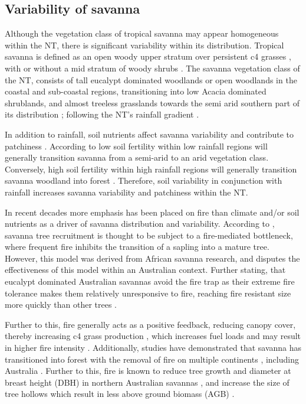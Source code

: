 \subsection{Variability of savanna}
Although the vegetation class of tropical savanna may appear homogeneous within the NT, there is significant variability within its distribution. Tropical savanna is defined as an open woody upper stratum over persistent c4 grasses \citep{williamsetal1997}, with or without a mid stratum of woody shrubs \citep{lehmannetal2011}. The savanna vegetation class of the NT, consists of tall eucalypt dominated woodlands or open woodlands in the coastal and sub-coastal regions, transitioning into low Acacia dominated shrublands, and almost treeless grasslands towards the semi arid southern part of its distribution \citep{foxetal2001, williamsetal1997, woinarski2007}; following  the NT's rainfall gradient \citep{houseHall2001, hutleyetal2011, lehmannetal2011, williams1996}.

In addition to rainfall, soil nutrients affect savanna variability and contribute to patchiness \citep{williams1996}. According to \cite{houseHall2001} low soil fertility within low rainfall regions will generally transition savanna from a semi-arid to an arid vegetation class. Conversely, high soil fertility within high rainfall regions will generally transition savanna woodland into forest \citep{houseHall2001, williams1996}. Therefore, soil variability in conjunction with rainfall increases savanna variability and patchiness within the NT.

In recent decades more emphasis has been placed on fire than climate and/or soil nutrients as a driver of savanna distribution and variability. According to \cite{prioretal2010}, savanna tree recruitment is thought to be subject to a fire-mediated bottleneck, where frequent fire inhibits the transition of a sapling into a mature tree. However, this model was derived from African savanna research, and \cite{murpheyetal2015} disputes the effectiveness of this model within an Australian context. Further stating, that eucalypt dominated Australian savannas avoid the fire trap as their extreme fire tolerance makes them relatively unresponsive to fire, reaching fire resistant size more quickly than other trees \citep{murpheyetal2015}.

Further to this, fire generally acts as a positive feedback, reducing canopy cover, thereby increasing c4 grass production \citep{bondetal2005, bond2008, woinarskietal2004b}, which increases fuel loads and may result in higher fire intensity \citep{lehmannetal2011, ratnametal2011}. Additionally, studies have demonstrated that savanna has transitioned into forest with the removal of fire on multiple continents \citep{bond2008}, including Australia \citep{woinarskietal2004b}. Further to this, fire is known to reduce tree growth and diameter at breast height (DBH) in northern Australian savannas \citep{murphyetal2010, williams1999}, and increase the size of tree hollows which result in less above ground biomass (AGB) \citep{peetersbutler2014}. 


